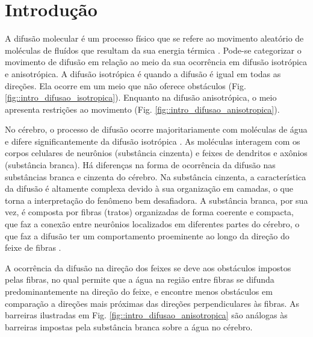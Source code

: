 \documentclass[
    12pt,                %
    oneside,            %
    a4paper,            %
    english,            %
    french,                %
    spanish,            %
    brazil                %
    ]{abntex2}
\begin{document}
\chapter{Introdução}
\label{sec:introducao}

A difusão molecular é um processo físico que se refere ao movimento aleatório de moléculas de fluídos que resultam da sua energia térmica \cite{lebihan2006}. 
Pode-se categorizar o movimento de difusão em relação ao meio da sua ocorrência em difusão isotrópica e anisotrópica. A difusão isotrópica é quando a difusão é igual em todas as direções. Ela ocorre em um meio que não oferece obstáculos (Fig. \ref{fig::intro_difusao_isotropica}). Enquanto na difusão anisotrópica, o meio apresenta restrições ao movimento (Fig. \ref{fig::intro_difusao_anisotropica}).

No cérebro, o processo de difusão ocorre majoritariamente com moléculas de água e difere significantemente da difusão isotrópica \cite{lebihan2006}. As moléculas interagem com os corpos celulares de neurônios (substância cinzenta) e feixes de dendritos e axônios (substância branca).
Há diferenças na forma de ocorrência da difusão nas substâncias branca e cinzenta do cérebro. Na substância cinzenta, a característica da difusão é altamente complexa devido à sua organização em camadas, o que torna a interpretação do fenômeno bem desafiadora. A substância branca, por sua vez, é composta por fibras (tratos) organizadas de forma coerente e compacta, que faz a conexão entre neurônios localizados em diferentes partes do cérebro, o que faz a difusão ter um comportamento proeminente ao longo da direção do feixe de fibras \cite{DTI_Handbook}.

A ocorrência da difusão na direção dos feixes se deve aos obstáculos impostos pelas fibras, no qual permite que a água na região entre fibras se difunda predominantemente na direção do feixe, e encontre menos obstáculos em comparação a direções mais próximas das direções perpendiculares às fibras. As barreiras ilustradas em Fig. \ref{fig::intro_difusao_anisotropica} são análogas 
às barreiras impostas pela substância branca sobre a água no cérebro.
\end{document}
